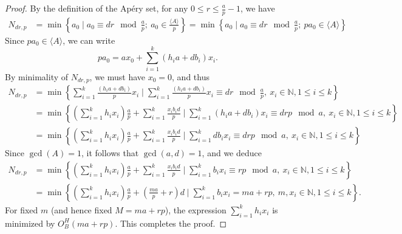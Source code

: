 \documentclass[10pt,a4paper]{amsart}
\begin{document}
\begin{proof}
By the definition of the Ap\'ery set, for any $0\leq r\leq \frac{a}{p}-1$, we have
\begin{align*}
N_{dr,p}&=\min\left\{ a_0\mid a_0\equiv dr\mod \frac{a}{p};\ a_0\in \frac{\langle A\rangle}{p}\right\}
=\min\left\{ a_0\mid a_0\equiv dr \mod \frac{a}{p};\ pa_0\in \langle A\rangle\right\}
\end{align*}
Since $p a_0 \in \langle A\rangle$, we can write
$$pa_0=a x_0+\sum_{i=1}^k(h_ia+db_i)x_i.$$
By minimality of $N_{dr,p}$, we must have $x_0 = 0$, and thus
\begin{align*}
N_{dr,p}&=\min\left\{\sum_{i=1}^k\frac{(h_ia+db_i)}{p}x_i\mid \sum_{i=1}^k\frac{(h_ia+db_i)}{p}x_i\equiv dr\mod \frac{a}{p}, \ x_i\in\mathbb{N}, 1\leq i\leq k \right\}
\\&=\min\left\{\left(\sum_{i=1}^k h_ix_i\right)\frac{a}{p}+\sum_{i=1}^k\frac{x_ib_id}{p} \mid \sum_{i=1}^k(h_ia+db_i)x_i\equiv drp \mod a, \ x_i\in\mathbb{N}, 1\leq i\leq k\right\}
\\&=\min\left\{\left(\sum_{i=1}^k h_ix_i\right)\frac{a}{p}+\sum_{i=1}^k\frac{x_ib_id}{p} \mid \sum_{i=1}^kdb_ix_i\equiv drp \mod a, \ x_i\in\mathbb{N}, 1\leq i\leq k\right\}
\end{align*}
Since $\gcd(A) = 1$, it follows that $\gcd(a, d) = 1$, and we deduce
\begin{align*}
N_{dr,p}&=\min\left\{\left(\sum_{i=1}^k h_ix_i\right)\frac{a}{p}+\sum_{i=1}^k\frac{x_ib_id}{p} \mid \sum_{i=1}^kb_ix_i\equiv rp \mod a, \ x_i\in\mathbb{N}, 1\leq i\leq k\right\}
\\&=\min\left\{\left(\sum_{i=1}^k h_ix_i\right)\frac{a}{p}+\left(\frac{ma}{p}+r\right)d \mid \sum_{i=1}^kb_ix_i=ma+rp, \ m,x_i\in\mathbb{N}, 1\leq i\leq k\right\}.
\end{align*}
For fixed $m$ (and hence fixed $M=ma+rp$), the expression $\sum_{i=1}^k h_i x_i$ is minimized by $O_B^{H}(ma +rp)$. This completes the proof.
\end{proof}
\end{document}
